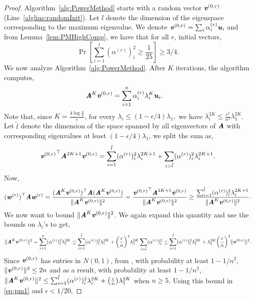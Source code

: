 \PowerMethod*
\begin{proof}

Algorithm~\ref{alg:PowerMethod} starts with a random vector $\vv^{(0,r)}$ (Line~\ref{algline:randomInit}). Let $l$ denote the dimension of the eigenspace corresponding to the maximum eigenvalue. We denote $\vv^{(0,r)} = \sum_i \alpha^{(r)}_i \uu_i$ and from Lemma~\ref{lem:PMHighComp}, we have that for all $r$, initial vectors,
\[
\Pr\left[\sum_{i=1}^l(\alpha^{(r)})_i^2 \geq \frac{1}{25}\right]\geq 3/4.
\]
%
We now analyze Algorithm~\ref{alg:PowerMethod}. After $K$ iterations, the algorithm computes,
\begin{align*}
\AA^K\vv^{(0,r)} & =\sum_{i =1 }^{n}\alpha^{(r)}_i \lambda_i^K \uu_i .
\end{align*}
  Note that, since $K = \frac{4\log \frac{n}{\epsilon}}{\epsilon}$, for every $\lambda_i \leq (1-\epsilon/4)\lambda_1,$ we have $\lambda_i^{2K} \leq \frac{\epsilon^{2}}{n^{2}}\lambda_1^{2K}$. Let $\tilde{l}$ denote the dimension of the space spanned by all eigenvectors of $\AA$ with corresponding eigenvalues at least $(1-\epsilon/4)\lambda_1$, we split the sum as,
\[
{\vv^{(0,r)}}^{\top}\AA^{2K+1}\vv^{(0,r)}  =\sum_{i =1 }^{\tilde{l}}(\alpha^{(r)})_i^2 \lambda_i^{2K+1} + \sum_{i >\tilde{l}}(\alpha^{(r)})_i^2 \lambda_i^{2K+1} .
\]
 Now,
 \begin{equation}\label{eq:pm1}
 (\ww^{(r)})^{\top}\AA\ww^{(r)} = \frac{(\AA^K\vv^{(0,r)})^{\top}\AA(\AA^K\vv^{(0,r)})}{\|\AA^K\vv^{(0,r)}\|^2}  = \frac{{\vv^{(0,r)}}^{\top}\AA^{2K+1}\vv^{(0,r)}}{\|\AA^K\vv^{(0,r)}\|^2}  \geq \frac{\sum_{i =1 }^{\tilde{l}}(\alpha^{(r)})^2_i \lambda_i^{2K+1} }{\|\AA^K\vv^{(0,r)}\|^2}.
 \end{equation}
We now want to bound $\|\AA^K\vv^{(0,r)}\|^2$. We again expand this quantity and use the bounds on $\lambda_i$'s to get, 
\[
\|\AA^K\vv^{(0,r)}\|^2 = \sum_{i =1 }^{n}(\alpha^{(r)})_i^2 \lambda_i^{2K} \leq \sum_{i =1 }^{\tilde{l}}(\alpha^{(r)})_i^2 \lambda_i^{2K} + \left(\frac{\epsilon}{n}\right)^{2}\lambda_1^{2K}\sum_{i>\tilde{l}}(\alpha^{(r)})_i^2 \leq \sum_{i =1 }^{\tilde{l}}(\alpha^{(r)})_i^2 \lambda_i^{2K}+\lambda_1^{2K}\left(\frac{\epsilon}{n}\right)^2\|\vv^{(0,r)}\|^2.
\]
Since $\vv^{(0,r)}$ has entries in $N(0,1)$, from , with probability at least $1-1/n^2$, $\|\vv^{(0,r)}\|^2 \leq 2n$ and as a result, with probability at least $1-1/n^2$, $\|\AA^K\vv^{(0,r)}\|^2 \leq \sum_{i =1 }^{\tilde{l}}(\alpha^{(r)})_i^2 \lambda_i^{2K}+\left(\frac{\epsilon}{n}\right)\lambda_1^{2K}$ when $n\geq 5$. Using this bound in \eqref{eq:pm1} and $\epsilon<1/20$,

\end{proof}

